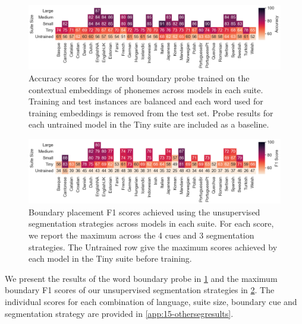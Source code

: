 \begin{figure}[t]
    \centering
    \includegraphics[width=\linewidth]{Figures/15Segmentation/probe_results.png}
    \caption{Accuracy scores for the word boundary probe trained on the contextual embeddings of phonemes across models in each suite. Training and test instances are balanced and each word used for training embeddings is removed from the test set. Probe results for each untrained model in the Tiny suite are included as a baseline.}
    \label{fig:15-probes}
\end{figure}

\begin{figure}[t]
    \centering
    \includegraphics[width=\linewidth]{Figures/15Segmentation/unsupervised.png}
    \caption{Boundary placement F1 scores achieved using the unsupervised segmentation strategies across models in each suite. For each score, we report the maximum across the 4 cues and 3 segmentation strategies. The Untrained row give the maximum scores achieved by each model in the Tiny suite before training.}
    \label{fig:15-unsupervised}
\end{figure}


We present the results of the word boundary probe in \cref{fig:15-probes} and the maximum boundary F1 scores of our unsupervised segmentation strategies in \cref{fig:15-unsupervised}. The individual scores for each combination of language, suite size, boundary cue and segmentation strategy are provided in \cref{app:15-othersegresults}. %

